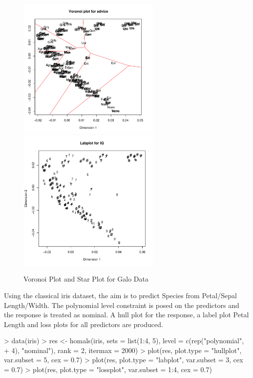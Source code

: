 \documentclass[article]{Z}
\begin{document}
\begin{figure}[hbt]
\begin{center}
\includegraphics[height=70mm, width=70mm]{galoVor.pdf}
\includegraphics[height=70mm, width=70mm]{galoLab.pdf}
\caption{\label{fig:vor}Voronoi Plot and Star Plot for Galo Data}
\end{center}
\end{figure}

Using the classical iris dataset, the aim is to predict Species from Petal/Sepal Length/Width. The polynomial level constraint is posed on the predictors and the response is treated as nominal. A hull plot for the response, a label plot Petal Length and loss plots for all predictors are produced.

\begin{Schunk}
\begin{Sinput}
> data(iris)
> res <- homals(iris, sets = list(1:4, 5), level = c(rep("polynomial", 
+     4), "nominal"), rank = 2, itermax = 2000)
> plot(res, plot.type = "hullplot", var.subset = 5, cex = 0.7)
> plot(res, plot.type = "labplot", var.subset = 3, cex = 0.7)
> plot(res, plot.type = "lossplot", var.subset = 1:4, cex = 0.7)
\end{Sinput}
\end{Schunk}
\end{document}
